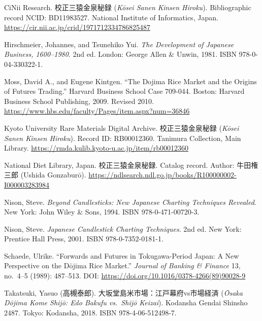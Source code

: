 \documentclass[10pt, openany]{book}
\newcommand{\jp}[1]{{\japanesefont #1}}
\begin{document}
\begin{description}[style=nextline, leftmargin=0em, font=\normalfont]

\item CiNii Research. \jp{校正三猿金泉秘録} (\textit{K\=osei Sanen Kinsen
  Hiroku}). Bibliographic record NCID: BD11983527. National Institute of
  Informatics, Japan.
  \url{https://cir.nii.ac.jp/crid/1971712334786825487}

\item Hirschmeier, Johannes, and Tsunehiko Yui. \textit{The Development of
  Japanese Business, 1600--1980}. 2nd ed. London: George Allen \& Unwin,
  1981. ISBN 978-0-04-330322-1.

\item Moss, David A., and Eugene Kintgen. ``The Dojima Rice Market and
  the Origins of Futures Trading.'' Harvard Business School Case 709-044.
  Boston: Harvard Business School Publishing, 2009. Revised 2010.
  \url{https://www.hbs.edu/faculty/Pages/item.aspx?num=36846}

\item Kyoto University Rare Materials Digital Archive. \jp{校正三猿金泉秘録}
  (\textit{K\=osei Sanen Kinsen Hiroku}). Record ID: RB00012360.
  Tanimura Collection, Main Library.
  \url{https://rmda.kulib.kyoto-u.ac.jp/item/rb00012360}

\item National Diet Library, Japan. \jp{校正三猿金泉秘録}. Catalog record.
  Author: \jp{牛田権三郎} (Ushida Gonzabur\=o).
  \url{https://ndlsearch.ndl.go.jp/books/R100000002-I000003283984}

\item Nison, Steve. \textit{Beyond Candlesticks: New Japanese Charting
  Techniques Revealed}. New York: John Wiley \& Sons, 1994.
  ISBN 978-0-471-00720-3.

\item Nison, Steve. \textit{Japanese Candlestick Charting Techniques}.
  2nd ed. New York: Prentice Hall Press, 2001.
  ISBN 978-0-7352-0181-1.

\item Schaede, Ulrike. ``Forwards and Futures in Tokugawa-Period Japan:
  A New Perspective on the D\=ojima Rice Market.'' \textit{Journal of
  Banking \& Finance} 13, no.~4--5 (1989): 487--513.
  DOI: \url{https://doi.org/10.1016/0378-4266(89)90028-9}

\item Takatsuki, Yasuo (\jp{高槻泰郎}). \jp{大坂堂島米市場：江戸幕府vs市場経済}
  (\textit{\=Osaka D\=ojima Kome Shij\=o: Edo Bakufu vs.\ Shij\=o Keizai}).
  Kodansha Gendai Shinsho 2487. Tokyo: Kodansha, 2018.
  ISBN 978-4-06-512498-7.


\end{description}
\end{document}
